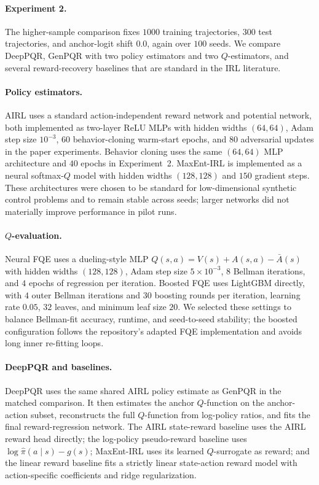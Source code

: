 \paragraph{Experiment 2.}
The higher-sample comparison fixes \(1000\) training trajectories, \(300\) test
trajectories, and anchor-logit shift \(0.0\), again over \(100\) seeds. We
compare DeepPQR, GenPQR with two policy estimators and two \(Q\)-estimators,
and several reward-recovery baselines that are standard in the IRL literature.

\paragraph{Policy estimators.}
AIRL uses a standard action-independent reward network and potential network,
both implemented as two-layer ReLU MLPs with hidden widths \((64,64)\), Adam
step size \(10^{-3}\), \(60\) behavior-cloning warm-start epochs, and \(80\)
adversarial updates in the paper experiments. Behavior cloning uses the same
\((64,64)\) MLP architecture and \(40\) epochs in Experiment~2. MaxEnt-IRL is
implemented as a neural softmax-\(Q\) model with hidden widths \((128,128)\)
and \(150\) gradient steps. These architectures were chosen to be standard for
low-dimensional synthetic control problems and to remain stable across seeds;
larger networks did not materially improve performance in pilot runs.

\paragraph{\(Q\)-evaluation.}
Neural FQE uses a dueling-style MLP \(Q(s,a)=V(s)+A(s,a)-\bar A(s)\) with
hidden widths \((128,128)\), Adam step size \(5\times 10^{-3}\), \(8\) Bellman
iterations, and \(4\) epochs of regression per iteration. Boosted FQE uses
LightGBM directly, with \(4\) outer Bellman iterations and \(30\) boosting
rounds per iteration, learning rate \(0.05\), \(32\) leaves, and minimum leaf
size \(20\). We selected these settings to balance Bellman-fit accuracy,
runtime, and seed-to-seed stability; the boosted configuration follows the
repository's adapted FQE implementation and avoids long inner re-fitting loops.

\paragraph{DeepPQR and baselines.}
DeepPQR uses the same shared AIRL policy estimate as GenPQR in the matched
comparison. It then estimates the anchor \(Q\)-function on the anchor-action
subset, reconstructs the full \(Q\)-function from log-policy ratios, and fits
the final reward-regression network. The AIRL state-reward baseline uses the
AIRL reward head directly; the log-policy pseudo-reward baseline uses
\(\log \hat\pi(a\mid s)-g(s)\); MaxEnt-IRL uses its learned \(Q\)-surrogate as
reward; and the linear reward baseline fits a strictly linear state-action
reward model with action-specific coefficients and ridge regularization.

